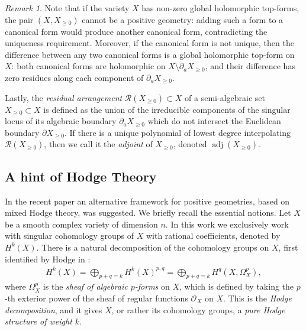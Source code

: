\documentclass[12pt]{extarticle}
\theoremstyle{definition}
\theoremstyle{theorem}
\theoremstyle{remark}
\newtheorem{remark}[definition]{Remark}
\numberwithin{equation}{section}
\begin{document}
\begin{remark} \label{rem:holomorph}
Note that if the variety $X$ has non-zero global holomorphic top-forms, the pair $(X, X_{\geq 0})$ cannot be a positive geometry: adding such a form to a canonical form would produce another canonical form, contradicting the uniqueness requirement.
Moreover, if the canonical form is not unique, then the difference between any two canonical forms is a global holomorphic top-form on $X$: both canonical forms are holomorphic on $X\setminus\partial_{a}X_{\geq 0}$, and their difference has zero residues along each component of $\partial_{a}X_{\geq 0}$.
\end{remark}

Lastly, the \emph{residual arrangement} $\mathcal{R}(X_{\geq0})\subset X$ of a semi-algebraic set $X_{\geq 0}\subset X$ is defined as the union of the irreducible components of the singular locus of its algebraic boundary $\partial_aX_{\geq0}$ which do not intersect the Euclidean boundary $\partial X_{\geq 0}$.
If there is a unique polynomial of lowest degree interpolating $\mathcal{R}(X_{\geq0})$, then we call it the \emph{adjoint} of $X_{\geq 0}$, denoted $\operatorname{adj}(X_{\geq 0})$.

\subsection{A hint of Hodge Theory}

In the recent paper \cite{brown-dupont} an alternative framework for positive geometries, based on mixed Hodge theory, was suggested. We briefly recall the essential notions.
Let $X$ be a smooth complex variety of dimension $n$.
In this work we exclusively work with singular cohomology groups of $X$ with rational coefficients, denoted by $H^k(X)$.
There is a natural decomposition of the cohomology groups on $X$, first identified by Hodge in \cite{Hodge}:
\begin{align}\label{eq:pure_HS_decomp}
    H^k(X)=\bigoplus_{p+q=k}H^k(X)^{p,q}=\bigoplus_{p+q=k}H^q(X,\Omega_X^p),
\end{align}
where $\Omega_X^p$ is the \emph{sheaf of algebraic $p$-forms} on $X$, which is defined by taking the $p$-th exterior power of the sheaf of regular functions $\mathcal{O}_X$ on $X$.
This is the \emph{Hodge decomposition}, and it gives $X$, or rather its cohomology groups, a \emph{pure Hodge structure of weight $k$}.
\end{document}
